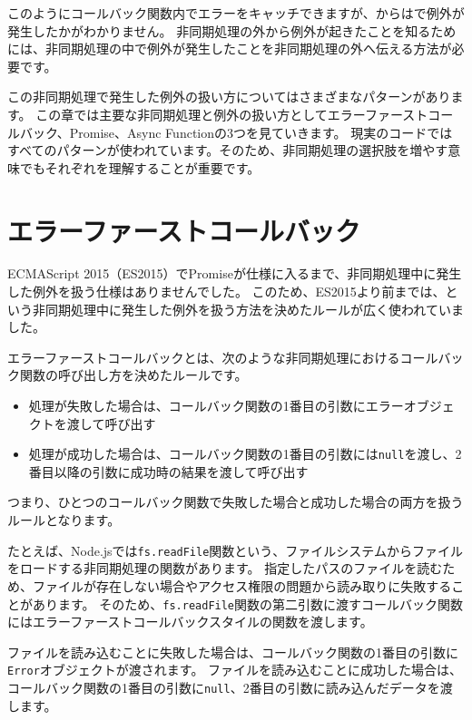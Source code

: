 このようにコールバック関数内でエラーをキャッチできますが、\textbf{}からは\textbf{}で例外が発生したかがわかりません。
非同期処理の外から例外が起きたことを知るためには、非同期処理の中で例外が発生したことを非同期処理の外へ伝える方法が必要です。

この非同期処理で発生した例外の扱い方についてはさまざまなパターンがあります。
この章では主要な非同期処理と例外の扱い方としてエラーファーストコールバック、Promise、Async
Functionの3つを見ていきます。
現実のコードではすべてのパターンが使われています。そのため、非同期処理の選択肢を増やす意味でもそれぞれを理解することが重要です。

\hypertarget{error-first-callback}{%
\section{エラーファーストコールバック}\label{error-first-callback}}

ECMAScript
2015（ES2015）でPromiseが仕様に入るまで、非同期処理中に発生した例外を扱う仕様はありませんでした。
このため、ES2015より前までは、\textbf{}という非同期処理中に発生した例外を扱う方法を決めたルールが広く使われていました。

エラーファーストコールバックとは、次のような非同期処理におけるコールバック関数の呼び出し方を決めたルールです。

\begin{itemize}
\item
  処理が失敗した場合は、コールバック関数の1番目の引数にエラーオブジェクトを渡して呼び出す
\item
  処理が成功した場合は、コールバック関数の1番目の引数には\texttt{null}を渡し、2番目以降の引数に成功時の結果を渡して呼び出す
\end{itemize}

つまり、ひとつのコールバック関数で失敗した場合と成功した場合の両方を扱うルールとなります。

たとえば、Node.jsでは\texttt{fs.readFile}関数という、ファイルシステムからファイルをロードする非同期処理の関数があります。
指定したパスのファイルを読むため、ファイルが存在しない場合やアクセス権限の問題から読み取りに失敗することがあります。
そのため、\texttt{fs.readFile}関数の第二引数に渡すコールバック関数にはエラーファーストコールバックスタイルの関数を渡します。

ファイルを読み込むことに失敗した場合は、コールバック関数の1番目の引数に\texttt{Error}オブジェクトが渡されます。
ファイルを読み込むことに成功した場合は、コールバック関数の1番目の引数に\texttt{null}、2番目の引数に読み込んだデータを渡します。

